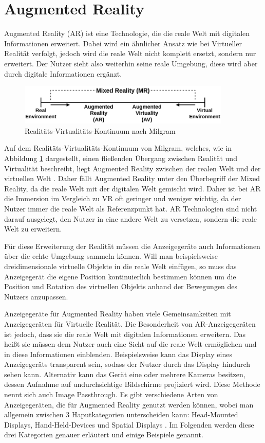   \section{Augmented Reality}
  Augmented Reality (AR) ist eine Technologie, die die reale Welt mit digitalen Informationen erweitert.
  Dabei wird ein ähnlicher Ansatz wie bei Virtueller Realität verfolgt, jedoch wird die reale Welt nicht komplett ersetzt, sondern nur erweitert.
  Der Nutzer sieht also weiterhin seine reale Umgebung, diese wird aber durch digitale Informationen ergänzt.
  \begin{figure}[H]
    \centering
    \includegraphics[width=0.9\textwidth]{images/RV-Continuum.png}
    \caption{Realitäts-Virtualitäts-Kontinuum nach Milgram}
    \label{fig:rv-continuum}
  \end{figure}
  Auf dem Realitäts-Virtualitäts-Kontinuum von Milgram, welches, wie in Abbildung \ref{fig:rv-continuum} dargestellt, einen fließenden Übergang zwischen Realität und Virtualität beschreibt, liegt Augmented Reality zwischen der realen Welt und der virtuellen Welt \autocite[vgl.][S.9]{milgram1999}.
  Daher fällt Augmented Reality unter den Überbegriff der Mixed Reality, da die reale Welt mit der digitalen Welt gemischt wird.
  Daher ist bei AR die Immersion im Vergleich zu VR oft geringer und weniger wichtig, da der Nutzer immer die reale Welt als Referenzpunkt hat.
  AR Technologien sind nicht darauf ausgelegt, den Nutzer in eine andere Welt zu versetzen, sondern die reale Welt zu erweitern.

  Für diese Erweiterung der Realität müssen die Anzeigegeräte auch Informationen über die echte Umgebung sammeln können.
  Will man beispielsweise dreidimensionale virtuelle Objekte in die reale Welt einfügen, so muss das Anzeigegerät die eigene Position kontinuierlich bestimmen können um die Position und Rotation des virtuellen Objekts anhand der Bewegungen des Nutzers anzupassen.

  Anzeigegeräte für Augmented Reality haben viele Gemeinsamkeiten mit Anzeigegeräten für Virtuelle Realität.
  Die Besonderheit von AR-Anzeigegeräten ist jedoch, dass sie die reale Welt mit digitalen Informationen erweitern.
  Das heißt sie müssen dem Nutzer auch eine Sicht auf die reale Welt ermöglichen und in diese Informationen einblenden.
  Beispielsweise kann das Display eines Anzeigegeräts transparent sein, sodass der Nutzer durch das Display hindurch sehen kann.
  Alternativ kann das Gerät eine oder mehrere Kameras besitzen, dessen Aufnahme auf undurchsichtige Bildschirme projiziert wird.
  Diese Methode nennt sich auch Image Passthrough.
  Es gibt verschiedene Arten von Anzeigegeräten, die für Augmented Reality genutzt werden können, wobei man allgemein zwischen 3 Haputkategorien unterscheiden kann: Head-Mounted Displays, Hand-Held-Devices und Spatial Displays \autocite[][S. 346]{Carmigniani2011}.
  Im Folgenden werden diese drei Kategorien genauer erläutert und einige Beispiele genannt.

